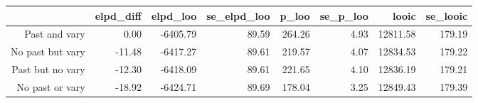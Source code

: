 \begin{table}[ht]
\centering
\begin{tabular}{rrrrrrrr}
  \hline
 & elpd\_diff & elpd\_loo & se\_elpd\_loo & p\_loo & se\_p\_loo & looic & se\_looic \\ 
  \hline
Past and vary & 0.00 & -6405.79 & 89.59 & 264.26 & 4.93 & 12811.58 & 179.19 \\ 
  No past but vary & -11.48 & -6417.27 & 89.61 & 219.57 & 4.07 & 12834.53 & 179.22 \\ 
  Past but no vary & -12.30 & -6418.09 & 89.61 & 221.65 & 4.10 & 12836.19 & 179.21 \\ 
  No past or vary & -18.92 & -6424.71 & 89.69 & 178.04 & 3.25 & 12849.43 & 179.39 \\ 
   \hline
\end{tabular}
\end{table}
